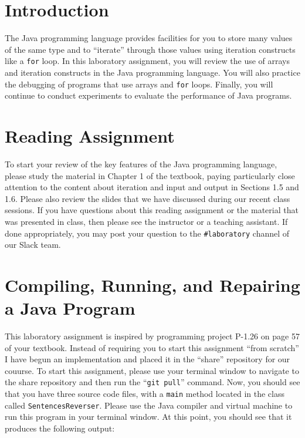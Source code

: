 

\usepackage[compact]{titlesec}



\section*{Introduction}

The Java programming language provides facilities for you to store many values of the same type and to ``iterate''
through those values using iteration constructs like a {\tt for} loop. In this laboratory assignment, you will review
the use of arrays and iteration constructs in the Java programming language. You will also practice the debugging of
programs that use arrays and {\tt for} loops. Finally, you will continue to conduct experiments to evaluate the
performance of Java programs.

\section*{Reading Assignment}

To start your review of the key features of the Java programming language, please study the material in Chapter 1 of the
textbook, paying particularly close attention to the content about iteration and input and output in Sections 1.5 and
1.6. Please also review the slides that we have discussed during our recent class sessions. If you have questions about
this reading assignment or the material that was presented in class, then please see the instructor or a teaching
assistant. If done appropriately, you may post your question to the {\tt \#laboratory} channel of our Slack team.

\section*{Compiling, Running, and Repairing a Java Program}

This laboratory assignment is inspired by programming project P-1.26 on page 57 of your textbook. Instead of requiring
you to start this assignment ``from scratch'' I have begun an implementation and placed it in the ``share'' repository
for our couurse. To start this assignment, please use your terminal window to navigate to the share repository and then
run the ``{\tt git pull}'' command. Now, you should see that you have three source code files, with a {\tt main}
method located in the class called {\tt SentencesReverser}. Please use the Java compiler and virtual machine to run this
program in your terminal window. At this point, you should see that it produces the following output:

